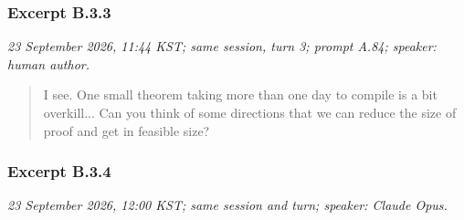 \subsubsection*{Excerpt B.3.3}
\label{ex:B33}
\noindent\textit{23 September 2026, 11:44 KST; same session, turn 3; prompt A.84; speaker: human author.}
\begin{quote}\small\ttfamily\raggedright
I see. One small theorem taking more than one day to compile is a bit overkill... Can you think of some directions that we can reduce the size of proof and get in feasible size?
\par
\end{quote}

\subsubsection*{Excerpt B.3.4}
\label{ex:B34}
\noindent\textit{23 September 2026, 12:00 KST; same session and turn; speaker: Claude Opus.}
